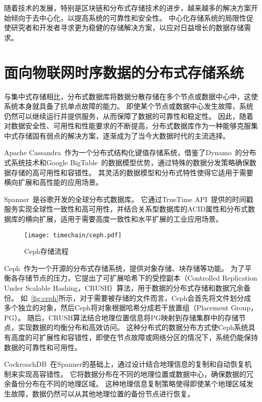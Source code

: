随着技术的发展，特别是区块链和分布式存储技术的进步，越来越多的解决方案开始倾向于去中心化，以提高系统的可靠性和安全性。
中心化存储系统的局限性促使研究者和开发者寻求更为稳健的存储解决方案，以应对日益增长的数据存储需求。

\section{面向物联网时序数据的分布式存储系统}
与集中式存储相比，分布式数据库将数据分散存储在多个节点或数据中心中，这使系统本身就具备了抗单点故障的能力。
即使某个节点或数据中心发生故障，系统仍然可以继续运行并提供服务，从而保障了数据的可靠性和稳定性。
因此，随着对数据安全性、可用性和性能要求的不断提高，分布式数据库作为一种能够克服集中式存储固有弱点的解决方案，逐渐成为了当今大数据时代的主流选择。

Apache Cassandra~\cite{lakshman2010cassandra}作为一个分布式结构化键值存储系统，借鉴了Dynamo~\cite{decandia2007dynamo}的分布式系统技术和Google BigTable~\cite{chang2008bigtable}的数据模型优势，通过特殊的数据分发策略确保数据存储的高可用性和容错性。
其灵活的数据模型和分布式特性使得它适用于需要横向扩展和高性能的应用场景。

Spanner~\cite{corbett2013spanner}是谷歌开发的全球分布式数据库。
它通过TrueTime API~\cite{cervin2016truetime}提供的时间戳服务实现全球性一致性和高可用性，并结合关系型数据库的ACID属性和分布式数据库的横向扩展，适用于需要高度一致性和水平扩展的工业应用场景。

\begin{figure}[t]
    \centering
    \texttt{[image: timechain/ceph.pdf]}
    \caption{Ceph存储流程}
    \label{fig:ceph}
\end{figure}

Ceph~\cite{weil2006ceph}作为一个开源的分布式存储系统，提供对象存储、块存储等功能。
为了平衡各存储节点的压力，它提出了可扩展哈希下的受控副本（Controlled Replication Under Scalable Hashing，CRUSH）算法，用于数据的分布式存储和数据冗余备份。
如~\autoref{fig:ceph}所示，对于需要被存储的文件而言，Ceph会首先将文件划分成多个独立的对象，然后Ceph将对象根据哈希分成若干放置组（Placement Group，PG）。
随后，CRUSH算法结合地理位置信息将PG映射到存储集群中的存储节点，实现数据的均衡分布和高效访问。
这种分布式的数据分布方式使Ceph系统具有高度的可扩展性和容错性，即使在节点故障或网络分区的情况下，系统仍能保持数据的可靠性和可用性。

CockroachDB~\cite{taft2020cockroachdb}在Spanner的基础上，通过设计结合地理信息的复制和自动恢复机制来实现高容错性。
它将数据分布在不同的地理位置或数据中心，确保数据的冗余备份分布在不同的地理区域。
这种地理信息复制策略使得即使某个地理区域发生故障，数据仍然可以从其他地理位置的备份节点进行恢复。

